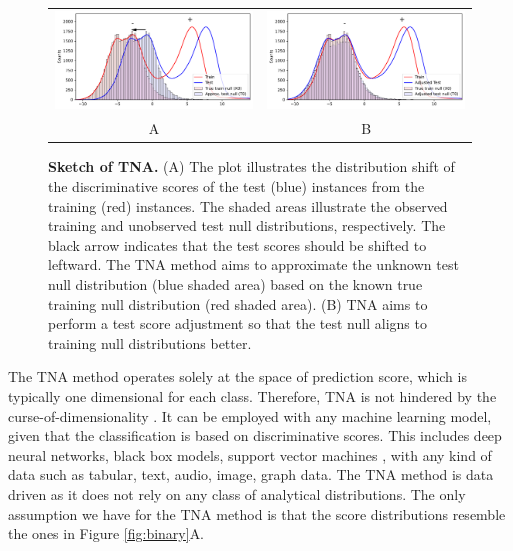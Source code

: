 \documentclass{article}
\begin{document}
\begin{figure}
	\centering
	\begin{tabular}{cc}
		\includegraphics[width=0.45\linewidth]{TNA_sketch_before.pdf}&
		\includegraphics[width=0.45\linewidth]{TNA_sketch_after.pdf} \\
		A & B  \\
	\end{tabular}
	\caption{{\bf Sketch of TNA. } (A) The plot illustrates the distribution shift of the discriminative scores of the test (blue) instances from the training (red) instances. The shaded areas illustrate the observed training and unobserved test null distributions, respectively. The black arrow indicates that the test scores should be shifted to leftward. The TNA method aims to approximate the unknown test null distribution (blue shaded area) based on the known true training null distribution (red shaded area). (B) TNA aims to perform a test score adjustment so that the test null aligns to training null distributions better. }
	\label{fig:tna_sketch}
\end{figure}


The TNA method operates solely at the space of prediction score, which is typically one dimensional for each class. Therefore, TNA is not hindered by the curse-of-dimensionality \cite{donoho2000high}. It can be employed with any machine learning model, given that the classification is based on discriminative scores. This includes deep neural networks, black box models, support vector machines \cite{cristianini2000introduction}, with any kind of data such as tabular, text, audio, image, graph data. The TNA method is data driven as it does not rely on any class of analytical distributions. The only assumption we have for the TNA method is that the score distributions resemble the ones in Figure \ref{fig:binary}A.

\end{document}
